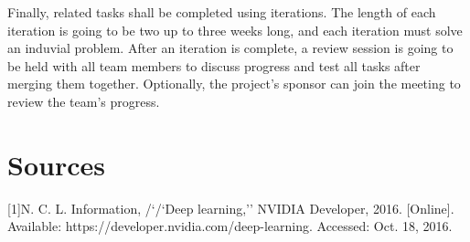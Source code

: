 \documentclass[letterpaper,10pt]{article}
\begin{document}
Finally, related tasks shall be completed using iterations.
The length of each iteration is going to be two up to three weeks long, and each iteration must solve an induvial problem.
After an iteration is complete, a review session is going to be held with all team members to discuss progress and test all tasks after merging them together. Optionally, the project’s sponsor can join the meeting to review the team's progress.

\section{Sources}

[1]N. C. L. Information, /`/`Deep learning,'' NVIDIA Developer, 2016. [Online]. Available: https://developer.nvidia.com/deep-learning. Accessed: Oct. 18, 2016.
\end{document}
